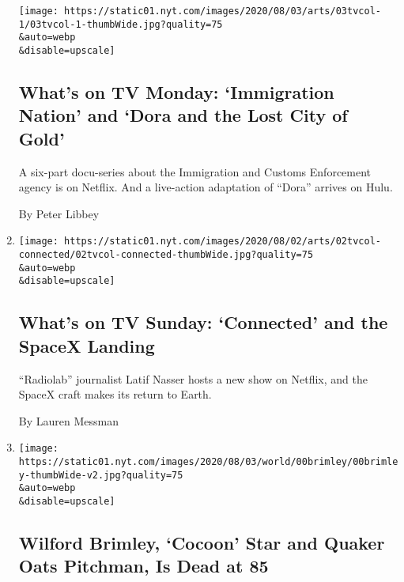 \begin{enumerate}
  \texttt{[image: https://static01.nyt.com/images/2020/08/03/arts/03tvcol-1/03tvcol-1-thumbWide.jpg?quality=75\\\&auto=webp\\\&disable=upscale]}

  \hypertarget{whats-on-tv-monday-immigration-nation-and-dora-and-the-lost-city-of-gold}{%
  \subsection{What's on TV Monday: `Immigration Nation' and `Dora and
  the Lost City of
  Gold'}\label{whats-on-tv-monday-immigration-nation-and-dora-and-the-lost-city-of-gold}}

  A six-part docu-series about the Immigration and Customs Enforcement
  agency is on Netflix. And a live-action adaptation of ``Dora'' arrives
  on Hulu.

  By Peter Libbey
\item
  \href{/2020/08/02/arts/television/whats-on-tv-sunday-connected-and-the-spacex-landing.html}{}

  \texttt{[image: https://static01.nyt.com/images/2020/08/02/arts/02tvcol-connected/02tvcol-connected-thumbWide.jpg?quality=75\\\&auto=webp\\\&disable=upscale]}

  \hypertarget{whats-on-tv-sunday-connected-and-the-spacex-landing}{%
  \subsection{What's on TV Sunday: `Connected' and the SpaceX
  Landing}\label{whats-on-tv-sunday-connected-and-the-spacex-landing}}

  ``Radiolab'' journalist Latif Nasser hosts a new show on Netflix, and
  the SpaceX craft makes its return to Earth.

  By Lauren Messman
\item
  \href{/2020/08/01/obituaries/wilford-brimley-dead.html}{}

  \texttt{[image: https://static01.nyt.com/images/2020/08/03/world/00brimley/00brimley-thumbWide-v2.jpg?quality=75\\\&auto=webp\\\&disable=upscale]}

  \hypertarget{wilford-brimley-cocoon-star-and-quaker-oats-pitchman-is-dead-at-85}{%
  \subsection{Wilford Brimley, `Cocoon' Star and Quaker Oats Pitchman,
  Is Dead at
  85}\label{wilford-brimley-cocoon-star-and-quaker-oats-pitchman-is-dead-at-85}}


\end{enumerate}

